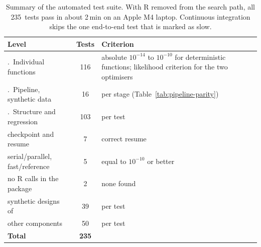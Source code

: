 \documentclass[preprint,12pt,a4paper]{elsarticle}
\begin{document}
{\begin{table}[!htbp]
\centering
\small
\setlength{\tabcolsep}{5pt}
\begin{tabularx}{\textwidth}{>{\raggedright\arraybackslash}p{5.6cm}c>{\raggedright\arraybackslash}X}
\toprule
\textbf{Level} & \textbf{Tests} & \textbf{Criterion} \\
\midrule
1.~Individual functions & 116 &
  absolute $10^{-14}$ to $10^{-10}$ for deterministic functions;
  likelihood criterion for the two optimisers \\
2.~Pipeline, synthetic data & 16 &
  per stage (Table~\ref{tab:pipeline-parity}) \\
3.~Structure and regression & 103 & per test \\
\quad checkpoint and resume & 7 & correct resume \\
\quad serial/parallel, fast/reference & 5 & equal to $10^{-10}$ or better \\
\quad no R calls in the package & 2 & none found \\
\quad synthetic designs of~\cite{contzen2025} & 39 & per test \\
\quad other components & 50 & per test \\
\midrule
\textbf{Total} & \textbf{235} & \\
\bottomrule
\end{tabularx}
\caption{Summary of the automated test suite. With R removed from the
  search path, all 235~tests pass in about 2\,min on an Apple M4
  laptop. Continuous integration skips the one end-to-end test that is
  marked as slow.}
\label{tab:validation}
\end{table}

}
\end{document}
